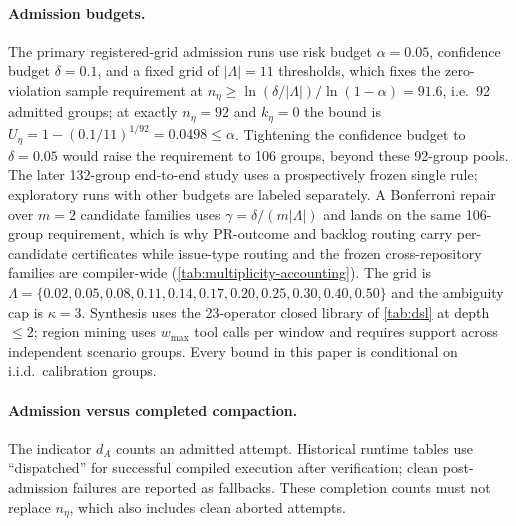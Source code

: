 \paragraph{Admission budgets.}
The primary registered-grid admission runs use risk budget $\alpha=0.05$, confidence budget
$\delta=0.1$, and a fixed grid of $|\Lambda|=11$ thresholds, which fixes the
zero-violation sample requirement at
$n_\eta\ge\ln(\delta/|\Lambda|)/\ln(1-\alpha)=91.6$, i.e.\ 92 admitted groups;
at exactly $n_\eta=92$ and $k_\eta=0$ the bound is
$U_\eta=1-(0.1/11)^{1/92}=0.0498\le\alpha$. Tightening the confidence budget to
 $\delta=0.05$ would raise the requirement to 106 groups, beyond these
92-group pools. The later 132-group end-to-end study uses a prospectively
frozen single rule; exploratory runs with other budgets are labeled separately. A Bonferroni repair over
$m=2$ candidate families uses $\gamma=\delta/(m|\Lambda|)$ and lands on the same
106-group requirement, which is why PR-outcome and backlog routing carry
per-candidate certificates while issue-type routing and the frozen
cross-repository families are compiler-wide (\cref{tab:multiplicity-accounting}). The grid is
$\Lambda=\{0.02,0.05,0.08,0.11,0.14,0.17,0.20,0.25,0.30,0.40,0.50\}$ and the ambiguity cap
is $\kappa=3$. Synthesis uses the 23-operator closed library of \cref{tab:dsl}
at depth $\le 2$; region mining uses $w_{\max}$ tool calls per window and
requires support across independent scenario groups. Every bound in this paper
is conditional on i.i.d.\ calibration groups.

\paragraph{Admission versus completed compaction.}
The indicator $d_A$ counts an admitted attempt. Historical runtime tables use
``dispatched'' for successful compiled execution after verification; clean
post-admission failures are reported as fallbacks. These completion counts
must not replace $n_\eta$, which also includes clean aborted attempts.

